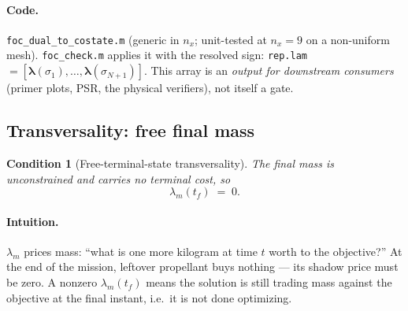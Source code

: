 \documentclass[11pt]{article}
\newcommand{\vlam}{\boldsymbol{\lambda}}
\newcommand{\file}[1]{\texttt{#1}}
\newcommand{\code}[1]{\texttt{#1}}
\newtheorem{condition}{Condition}
\begin{document}
\paragraph{Code.}
\file{foc\_dual\_to\_costate.m} (generic in $n_x$; unit-tested at $n_x=9$ on a
non-uniform mesh). \file{foc\_check.m} applies it with the resolved sign:
\code{rep.lam} $= [\vlam(\sigma_1),\dots,\vlam(\sigma_{N+1})]$. This array is
an \emph{output for downstream consumers} (primer plots, PSR, the physical
verifiers), not itself a gate.

\subsection{Transversality: free final mass}
\label{sec:transversality}

\begin{condition}[Free-terminal-state transversality]
The final mass is unconstrained and carries no terminal cost, so
\begin{equation}
\lambda_m(t_f) \;=\; 0 .
\label{eq:transv}
\end{equation}
\end{condition}

\paragraph{Intuition.}
$\lambda_m$ prices mass: ``what is one more kilogram at time $t$ worth to the
objective?'' At the end of the mission, leftover propellant buys nothing ---
its shadow price must be zero. A nonzero $\lambda_m(t_f)$ means the solution
is still trading mass against the objective at the final instant, i.e.\ it is
not done optimizing.
\end{document}
